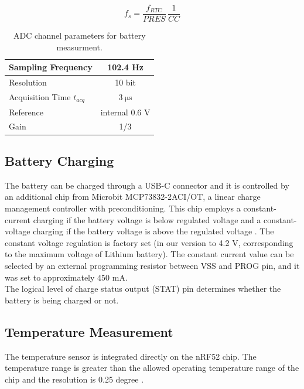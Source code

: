             
            \begin{equation}
                f_s = \frac{f_{RTC}}{PRES} \, \frac{1}{CC}
            \end{equation}
            
            \begin{table}[!ht]
                \begin{tabular}{l!{\vrule width 1pt}c}
                    Sampling Frequency & 102.4 Hz \\\hline
                    Resolution & 10 bit \\\hline
                    Acquisition Time $t_{acq}$ &  $\SI{3}{\micro\second}$\\\hline
                    Reference & internal 0.6 V\\\hline
                    Gain & 1/3 \\
                \end{tabular}
                \caption{ADC channel parameters for battery measurment.}
                \label{table:adc_properties}
            \end{table}
            
    \subsection{Battery Charging}
    \label{sec:battery_chargning_management}
        The battery can be charged through a USB-C connector and it is controlled by an additional chip from Microbit MCP73832-2ACI/OT, a linear charge management controller with preconditioning. This chip employs a constant-current charging if the battery voltage is below regulated voltage and a constant-voltage charging if the battery voltage is above the regulated voltage \cite{datasheet:mcp73832}.
        The constant voltage regulation is factory set (in our version to 4.2 V, corresponding to the maximum voltage of Lithium battery). The constant current value can be selected by an external programming resistor between VSS and PROG pin, and it was set to approximately 450 mA.\\
        The logical level of charge status output (STAT) pin determines whether the battery is being charged or not.
            
            
    \subsection{Temperature Measurement}
        The temperature sensor is integrated directly on the nRF52 chip. The temperature range is greater than the allowed operating temperature range of the chip and the resolution is 0.25 degree \cite[425]{datasheet:nrf52833}.
            
